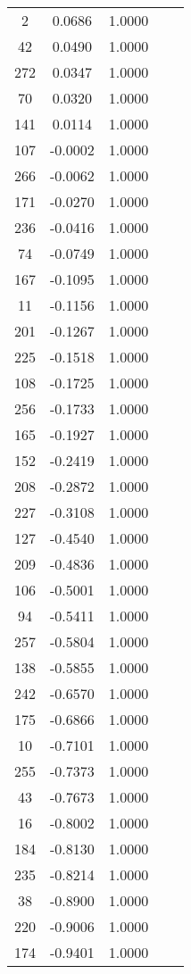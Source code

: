\documentclass[12pt]{article}\usepackage[]{graphicx}\usepackage[]{color}
\begin{document}
\begin{longtable}[c]{ccccc}
	2	& 0.0686 & 1.0000 & & \\
	42	& 0.0490 & 1.0000 & & \\
	272	& 0.0347 & 1.0000 & & \\
	70	& 0.0320 & 1.0000 & & \\
	141	& 0.0114 & 1.0000 & & \\
	107	& -0.0002 & 1.0000 & & \\
	266	& -0.0062 & 1.0000 & & \\
	171	& -0.0270 & 1.0000 & & \\
	236	& -0.0416 & 1.0000 & & \\
	74	& -0.0749 & 1.0000 & & \\
	167	& -0.1095 & 1.0000 & & \\
	11	& -0.1156 & 1.0000 & & \\
	201	& -0.1267 & 1.0000 & & \\
	225	& -0.1518 & 1.0000 & & \\
	108	& -0.1725 & 1.0000 & & \\
	256	& -0.1733 & 1.0000 & & \\
	165	& -0.1927 & 1.0000 & & \\
	152	& -0.2419 & 1.0000 & & \\
	208	& -0.2872 & 1.0000 & & \\
	227	& -0.3108 & 1.0000 & & \\
	127	& -0.4540 & 1.0000 & & \\
	209	& -0.4836 & 1.0000 & & \\
	106	& -0.5001 & 1.0000 & & \\
	94	& -0.5411 & 1.0000 & & \\
	257	& -0.5804 & 1.0000 & & \\
	138	& -0.5855 & 1.0000 & & \\
	242	& -0.6570 & 1.0000 & & \\
	175	& -0.6866 & 1.0000 & & \\
	10	& -0.7101 & 1.0000 & & \\
	255	& -0.7373 & 1.0000 & & \\
	43	& -0.7673 & 1.0000 & & \\
	16	& -0.8002 & 1.0000 & & \\
	184	& -0.8130 & 1.0000 & & \\
	235	& -0.8214 & 1.0000 & & \\
	38	& -0.8900 & 1.0000 & & \\
	220	& -0.9006 & 1.0000 & & \\
	174	& -0.9401 & 1.0000 & & \\

\end{longtable}
\end{document}
